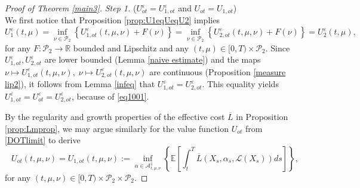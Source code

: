 \documentclass[reqno,11pt]{amsart}
\numberwithin{equation}{section}
\newcommand{\R}{\mathbb{R}} %
\newcommand{\e}{\varepsilon}
\newcommand{\nd}{\noindent}
\begin{document}
\begin{proof}[Proof of Theorem \ref{main3}]
    \textit{Step 1.} ($U^\e_{ot}=U^\e_{1,ot}$ and $U_{ot}=U_{1,ot}$)\\[0.5ex]
    We first notice that Proposition \ref{prop:U1eqUeqU2} implies
    $$U_1^\e(t,\mu)=\inf_{\nu\in \mathcal{P}_2}\left\{ U^\e_{1,ot}(t,\mu,\nu)+F(\nu)\right\}=\inf_{\nu\in \mathcal{P}_2}\left\{ U^\e_{2,ot}(t,\mu,\nu)+F(\nu)\right\}=U_2^\e(t,\mu),$$
    for any $F\colon\mathcal{P}_2\to \R$ bounded and Lipschitz and any $(t,\mu)\in [0,T)\times \mathcal{P}_2$.
    Since $U^\e_{1,ot},U^\e_{2,ot}$ are lower bounded (Lemma \ref{naive estimate}) and the maps $\nu\mapsto U^\e_{1,ot}(t,\mu,\nu),\; \nu\mapsto U^\e_{2,ot}(t,\mu,\nu)$ are continuous (Proposition \ref{measure lip2}), it follows from Lemma \ref{infeq} that $U^\e_{1,ot}=U^\e_{2,ot}$. This equality yields $U^\e_{1,ot}=U^\e_{ot}=U^\e_{2,ot}$, because of \eqref{eq1001}.
    \vspace{1mm}

    \nd
    By the regularity and growth properties of the effective cost $\overline{L}$ in Proposition \ref{prop:Lmprop}, we may argue similarly for the value function $U_{ot}$ from \eqref{DOTlimit} to derive
    $$U_{ot}(t,\mu,\nu)=U_{1,ot}(t,\mu,\nu):=\inf_{\alpha\in \mathcal{A}^1_{t,\mu,\nu}}\left\{\mathbb{E}\left[\int_t^T\overline{L}(X_s,\alpha_s,\mathcal{L}(X_s))ds   \right]\right\},$$
    for any $(t,\mu,\nu)\in [0,T)\times\mathcal{P}_2\times\mathcal{P}_2$.
    \vspace{2.5mm}


\end{proof}
\end{document}
